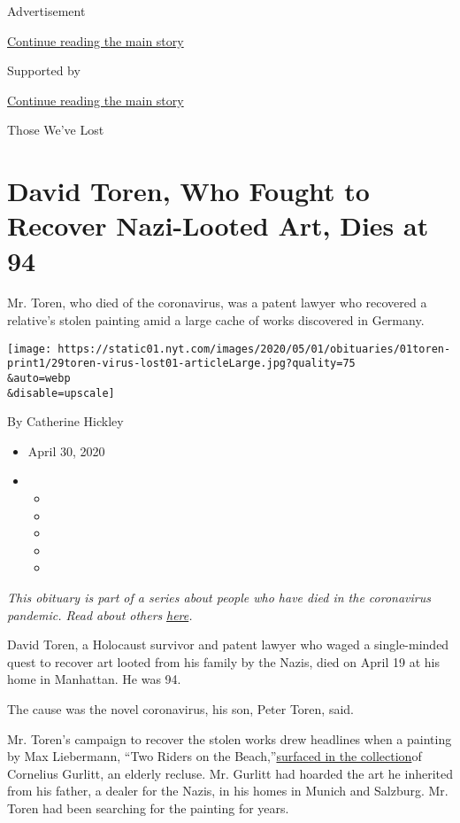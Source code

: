 Advertisement

\protect\hyperlink{after-top}{Continue reading the main story}

Supported by

\protect\hyperlink{after-sponsor}{Continue reading the main story}

Those We've Lost

\hypertarget{david-toren-who-fought-to-recover-nazi-looted-art-dies-at-94}{%
\section{David Toren, Who Fought to Recover Nazi-Looted Art, Dies at
94}\label{david-toren-who-fought-to-recover-nazi-looted-art-dies-at-94}}

Mr. Toren, who died of the coronavirus, was a patent lawyer who
recovered a relative's stolen painting amid a large cache of works
discovered in Germany.

\texttt{[image: https://static01.nyt.com/images/2020/05/01/obituaries/01toren-print1/29toren-virus-lost01-articleLarge.jpg?quality=75\\\&auto=webp\\\&disable=upscale]}

By Catherine Hickley

\begin{itemize}
\item
  April 30, 2020
\item
  \begin{itemize}
  \item
  \item
  \item
  \item
  \item
  \end{itemize}
\end{itemize}

\emph{This obituary is part of a series about people who have died in
the coronavirus pandemic. Read about others}
\href{https://www.nytimes.com/series/people-who-have-died-of-the-coronavirus}{\emph{here}}\emph{.}

David Toren, a Holocaust survivor and patent lawyer who waged a
single-minded quest to recover art looted from his family by the Nazis,
died on April 19 at his home in Manhattan. He was 94.

The cause was the novel coronavirus, his son, Peter Toren, said.

Mr. Toren's campaign to recover the stolen works drew headlines when a
painting by Max Liebermann, ``Two Riders on the
Beach,''\href{https://www.nytimes.com/2014/08/18/arts/design/experts-say-a-second-work-in-munich-was-looted.html}{surfaced
in the collection}of Cornelius Gurlitt, an elderly recluse. Mr. Gurlitt
had hoarded the art he inherited from his father, a dealer for the
Nazis, in his homes in Munich and Salzburg. Mr. Toren had been searching
for the painting for years.

